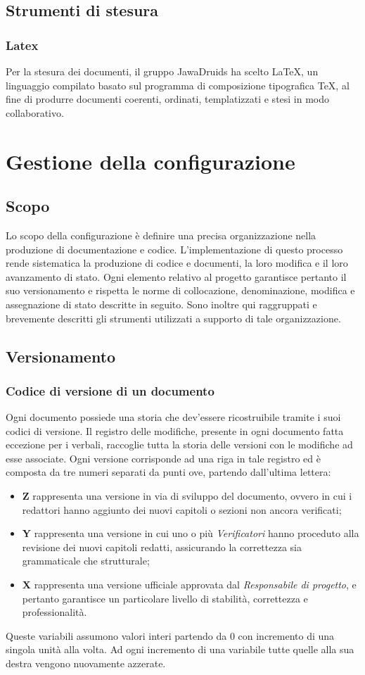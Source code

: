 \subsection{Strumenti di stesura}
\subsubsection{Latex}
Per la stesura dei documenti, il gruppo JawaDruids ha scelto \LaTeX, un linguaggio compilato basato sul programma di composizione tipografica \TeX, al fine di produrre documenti coerenti, ordinati, templatizzati e stesi in modo collaborativo.
\section{Gestione della configurazione}
\subsection{Scopo}
Lo scopo della configurazione è definire una precisa organizzazione nella produzione di documentazione e codice.
L'implementazione di questo processo rende sistematica la produzione di codice e documenti, la loro modifica e il loro avanzamento di stato.
Ogni elemento relativo al progetto garantisce pertanto il suo versionamento e rispetta le norme di collocazione, denominazione, modifica e assegnazione di stato descritte in seguito.
Sono inoltre qui raggruppati e brevemente descritti gli strumenti utilizzati a supporto di tale organizzazione.
\subsection{Versionamento}
\subsubsection{Codice di versione di un documento}
Ogni documento possiede una storia che dev'essere ricostruibile tramite i suoi codici di versione.
Il registro delle modifiche, presente in ogni documento fatta eccezione per i verbali, raccoglie tutta la storia delle versioni con le modifiche ad esse associate.
Ogni versione corrisponde ad una riga in tale registro ed è composta da tre numeri separati da punti
ove, partendo dall'ultima lettera:
\begin{itemize}
  \item \textbf{Z} rappresenta una versione in via di sviluppo del documento, ovvero in cui i redattori hanno aggiunto dei nuovi capitoli o sezioni non ancora verificati;
  \item \textbf{Y} rappresenta una versione in cui uno o più \textit{Verificatori} hanno proceduto alla revisione dei nuovi capitoli redatti, assicurando la correttezza sia grammaticale che strutturale;
  \item \textbf{X} rappresenta una versione ufficiale approvata dal \textit{Responsabile di progetto}, e pertanto garantisce un particolare livello di stabilità, correttezza e professionalità.
\end{itemize}
Queste variabili assumono valori interi partendo da 0 con incremento di una singola unità alla volta.
Ad ogni incremento di una variabile tutte quelle alla sua destra vengono nuovamente azzerate.
